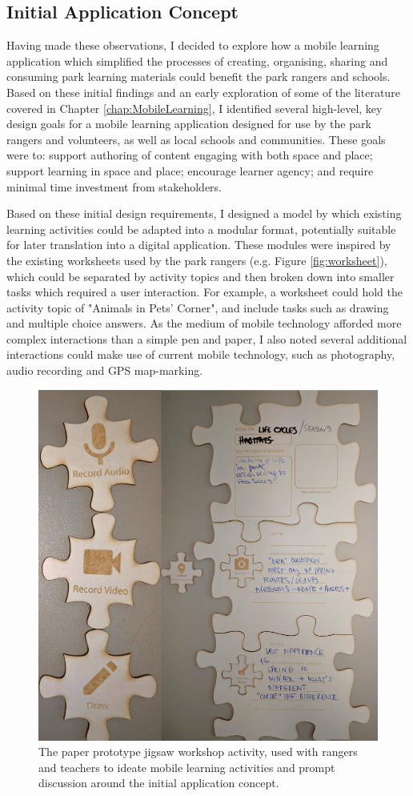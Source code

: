 \subsection{Initial Application Concept}

Having made these observations, I decided to explore how a mobile learning application which simplified the processes of creating, organising, sharing and consuming park learning materials could benefit the park rangers and schools. Based on these initial findings and an early exploration of some of the literature covered in Chapter \ref{chap:MobileLearning}, I identified several high-level, key design goals for a mobile learning application designed for use by the park rangers and volunteers, as well as local schools and communities. These goals were to: support authoring of content engaging with both space and place; support learning in space and place; encourage learner agency; and require minimal time investment from stakeholders. 

Based on these initial design requirements, I designed a model by which existing learning activities could be adapted into a modular format, potentially suitable for later translation into a digital application. These modules were inspired by the existing worksheets used by the park rangers (e.g. Figure \ref{fig:worksheet}), which could be separated by activity topics and then broken down into smaller tasks which required a user interaction. For example, a worksheet could hold the activity topic of "Animals in Pets' Corner", and include tasks such as drawing and multiple choice answers. As the medium of mobile technology afforded more complex interactions than a simple pen and paper, I also noted several additional interactions could make use of current mobile technology, such as photography, audio recording and GPS map-marking.

\begin{figure}
  \centering
  \includegraphics[width=0.75\columnwidth]{images/chapter04/rangerJigsaw.png}
  \caption[The jigsaw prototyping activity]{The paper prototype jigsaw workshop activity, used with rangers and teachers to ideate mobile learning activities and prompt discussion around the initial application concept.}
  \label{fig:rangerJigsaw}
\end{figure}

